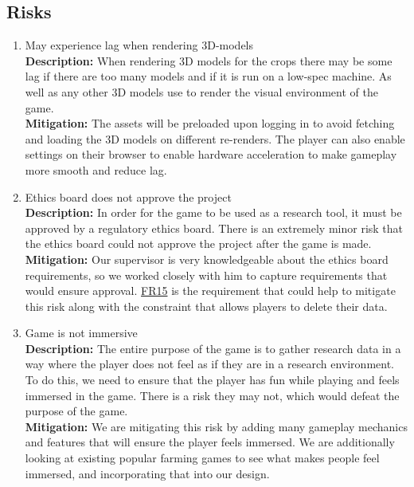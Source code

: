 \documentclass{article}
\begin{document}
\subsection{Risks}
\begin{enumerate}[{R}1.]
    \item May experience lag when rendering 3D-models 
    \\ \textbf{Description:} When rendering 3D models for the crops there may be some lag if there are too many models and if it is run on a low-spec machine. As well as any other 3D models use to render the visual environment of the game. 
    \\ \textbf{Mitigation:} The assets will be preloaded upon logging in to avoid fetching and loading the 3D models on different re-renders. The player can also enable settings on their browser to enable hardware acceleration to make gameplay more smooth and reduce lag.
    
    \item Ethics board does not approve the project
    \\ \textbf{Description:} In order for the game to be used as a research tool, it must be approved by a regulatory ethics board. There is an extremely minor risk that the ethics board could not approve the project after the game is made.
    \\ \textbf{Mitigation:} Our supervisor is very knowledgeable about the ethics board requirements, so we worked closely with him to capture requirements that would ensure approval. \hyperref[FR15]{FR15} is the requirement that could help to mitigate this risk along with the constraint that allows players to delete their data.
    
    \item Game is not immersive
    \\ \textbf{Description:} The entire purpose of the game is to gather research data in a way where the player does not feel as if they are in a research environment. To do this, we need to ensure that the player has fun while playing and feels immersed in the game. There is a risk they may not, which would defeat the purpose of the game.
    \\ \textbf{Mitigation:} We are mitigating this risk by adding many gameplay mechanics and features that will ensure the player feels immersed. We are additionally looking at existing popular farming games to see what makes people feel immersed, and incorporating that into our design.
    
\end{enumerate}
\end{document}
